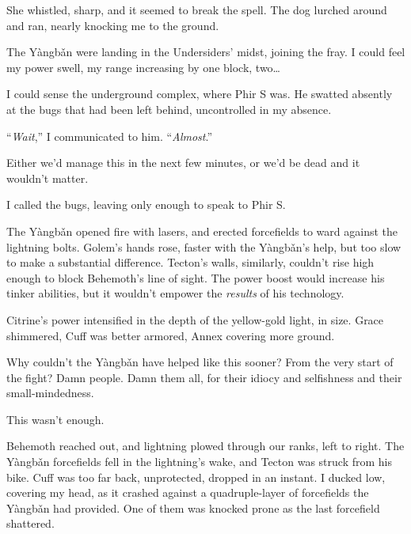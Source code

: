 She whistled, sharp, and it seemed to break the spell.  The dog lurched around and ran, nearly knocking me to the ground.



The Y\`{a}ngb\v{a}n were landing in the Undersiders' midst, joining the fray.  I could feel my power swell, my range increasing by one block, two\ldots



I could sense the underground complex, where Phir S was.  He swatted absently at the bugs that had been left behind, uncontrolled in my absence.



``\emph{Wait},'' I communicated to him.  ``\emph{Almost}.''



Either we'd manage this in the next few minutes, or we'd be dead and it wouldn't matter.



I called the bugs, leaving only enough to speak to Phir S.



The Y\`{a}ngb\v{a}n opened fire with lasers, and erected forcefields to ward against the lightning bolts.  Golem's hands rose, faster with the Y\`{a}ngb\v{a}n's help, but too slow to make a substantial difference.  Tecton's walls, similarly, couldn't rise high enough to block Behemoth's line of sight.  The power boost would increase his tinker abilities, but it wouldn't empower the \emph{results} of his technology.



Citrine's power intensified in the depth of the yellow-gold light, in size.  Grace shimmered, Cuff was better armored, Annex covering more ground.



Why couldn't the Y\`{a}ngb\v{a}n have helped like this sooner?  From the very start of the fight?  Damn people.  Damn them all, for their idiocy and selfishness and their small-mindedness.



This wasn't enough.



Behemoth reached out, and lightning plowed through our ranks, left to right.  The Y\`{a}ngb\v{a}n forcefields fell in the lightning's wake, and Tecton was struck from his bike.  Cuff was too far back, unprotected, dropped in an instant.  I ducked low, covering my head, as it crashed against a quadruple-layer of forcefields the Y\`{a}ngb\v{a}n had provided.  One of them was knocked prone as the last forcefield shattered.



